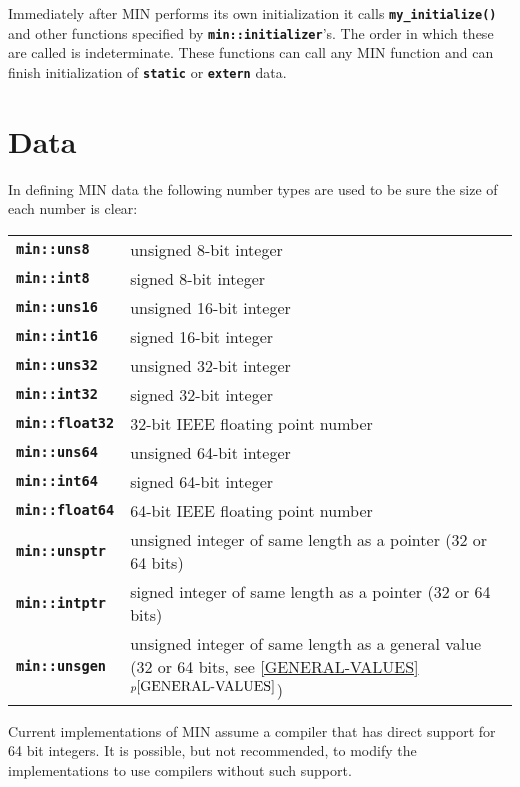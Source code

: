 \documentclass[12pt]{article}
\makeatletter
\newcommand{\TT}[1]{{\tt \bfseries #1}}
\newcommand{\ttindex}[1]{\index{#1@{\tt #1}}}
\newcommand{\minkey}[1]%
           {\TT{min::#1}\ttindex{min::#1}\ttindex{#1}}
\newcommand{\itemref}[1]{\ref{#1}$^{p\pageref{#1}}$}
\newcommand{\EOL}{\penalty \exhyphenpenalty}
\newcommand{\LABEL}[1]{\label{#1}}
\makeatother
\begin{document}
Immediately after MIN performs its own initialization
it calls \TT{my\_initialize()} and other functions specified by
\TT{min::\EOL initializer}'s.  The order in which these
are called is indeterminate.  These functions can call any
MIN function and can finish initialization of \TT{static} or
\TT{extern} data.

\section{Data}

In defining MIN data the following number types are used to be sure
the size of each number is clear:
\begin{center}
\begin{tabular}{l@{~~~~~}p{4.5in}}
\minkey{uns8}	& unsigned 8-bit integer \\
\minkey{int8}	& signed 8-bit integer \\
\minkey{uns16}	& unsigned 16-bit integer \\
\minkey{int16}	& signed 16-bit integer \\
\minkey{uns32}	& unsigned 32-bit integer \\
\minkey{int32}	& signed 32-bit integer \\
\minkey{float32}	& 32-bit IEEE floating point number \\
\minkey{uns64}	& unsigned 64-bit integer \\
\minkey{int64}	& signed 64-bit integer \\
\minkey{float64}	& 64-bit IEEE floating point number \\
\minkey{unsptr}	& unsigned integer of same length as a pointer (32 or 64 bits)
                  \\
\minkey{intptr}	& signed integer of same length as a pointer (32 or 64 bits)
                  \\
\minkey{unsgen}	& unsigned integer of same length as a general value
                  (32 or 64 bits, see \itemref{GENERAL-VALUES})
                  \\
\end{tabular}
\end{center}%
\LABEL{MIN::UNS8}%
\LABEL{MIN::INT8}%
\LABEL{MIN::UNS16}%
\LABEL{MIN::INT16}%
\LABEL{MIN::UNS32}%
\LABEL{MIN::INT32}%
\LABEL{MIN::FLOAT32}%
\LABEL{MIN::UNS64}%
\LABEL{MIN::INT64}%
\LABEL{MIN::FLOAT64}%
\LABEL{MIN::UNSPTR}%
\LABEL{MIN::INTPTR}%
\LABEL{MIN::UNSGEN}%
\label{INT}%
\label{UNS}

Current implementations of MIN assume a compiler that has
direct support for 64 bit integers.  It is possible, but not recommended,
to modify the implementations to use compilers without such support.
\end{document}
